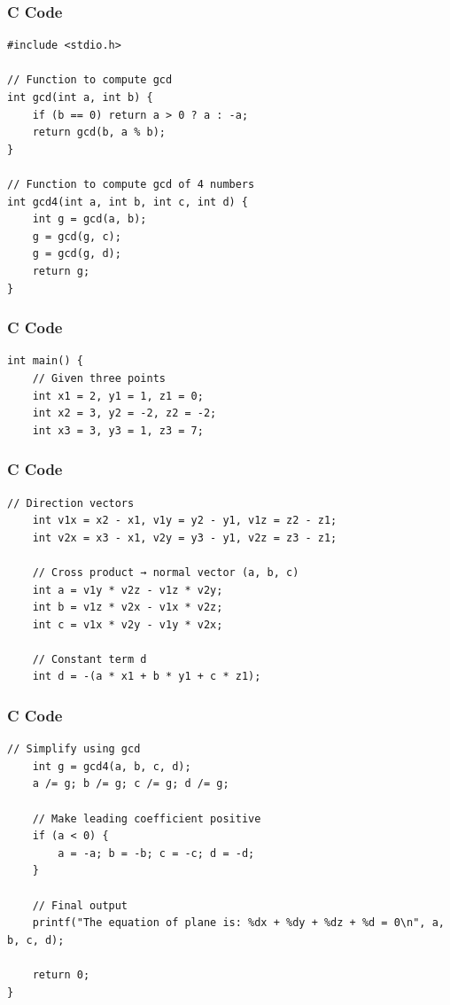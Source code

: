 \documentclass{beamer}
\begin{document}
\begin{frame}[fragile]
\frametitle{C Code}
\begin{lstlisting}
#include <stdio.h>

// Function to compute gcd
int gcd(int a, int b) {
    if (b == 0) return a > 0 ? a : -a;
    return gcd(b, a % b);
}

// Function to compute gcd of 4 numbers
int gcd4(int a, int b, int c, int d) {
    int g = gcd(a, b);
    g = gcd(g, c);
    g = gcd(g, d);
    return g;
}
\end{lstlisting}

\end{frame}

\begin{frame}[fragile]
\frametitle{C Code}
\begin{lstlisting}
int main() {
    // Given three points
    int x1 = 2, y1 = 1, z1 = 0;
    int x2 = 3, y2 = -2, z2 = -2;
    int x3 = 3, y3 = 1, z3 = 7;
\end{lstlisting}

\end{frame}

\begin{frame}[fragile]
\frametitle{C Code}
\begin{lstlisting}
// Direction vectors
    int v1x = x2 - x1, v1y = y2 - y1, v1z = z2 - z1;
    int v2x = x3 - x1, v2y = y3 - y1, v2z = z3 - z1;

    // Cross product → normal vector (a, b, c)
    int a = v1y * v2z - v1z * v2y;
    int b = v1z * v2x - v1x * v2z;
    int c = v1x * v2y - v1y * v2x;

    // Constant term d
    int d = -(a * x1 + b * y1 + c * z1);

\end{lstlisting}

\end{frame}

\begin{frame}[fragile]
\frametitle{C Code}
\begin{lstlisting}
// Simplify using gcd
    int g = gcd4(a, b, c, d);
    a /= g; b /= g; c /= g; d /= g;

    // Make leading coefficient positive
    if (a < 0) {
        a = -a; b = -b; c = -c; d = -d;
    }

    // Final output
    printf("The equation of plane is: %dx + %dy + %dz + %d = 0\n", a, b, c, d);

    return 0;
}

\end{lstlisting}

\end{frame}
\end{document}
